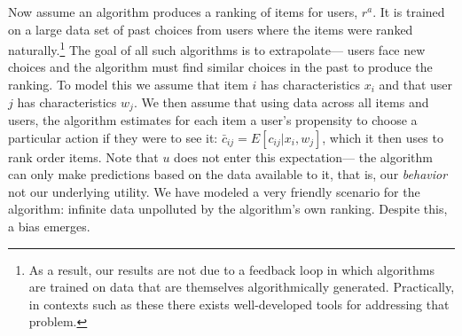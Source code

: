 \documentclass[12pt,letterpaper]{article}
\begin{document}
Now assume an algorithm produces a ranking of items for users, $r^a$. It is trained on a large data set of past choices from users where the items were ranked naturally.\footnote{As a result, our results are not due to a feedback loop in which algorithms are trained on data that are themselves algorithmically generated. Practically, in contexts such as these there exists well-developed tools for addressing that problem.} The goal of all such algorithms is to extrapolate--- users face new choices and the algorithm must find similar choices in the past to produce the ranking. To model this we assume that item $i$ has characteristics $x_i$ and that user $j$ has characteristics $w_j$. We then assume that using data across all items and users, the algorithm estimates for each item a user's propensity to choose a particular action if they were to see it: $\bar{c}_{ij} = E[c_{ij}|x_i,w_j]$, which it then uses to rank order items. Note that $u$ does not enter this expectation--- the algorithm can only make predictions based on the data available to it, that is, our \emph{behavior} not our underlying utility. We have modeled a very friendly scenario for the algorithm: infinite data unpolluted by the algorithm's own ranking. Despite this, a bias emerges. 
\end{document}
